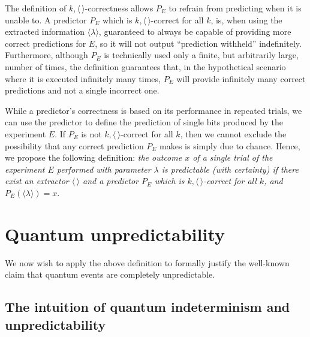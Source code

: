 \documentclass[%
 superscriptaddress,
 preprint,
 showpacs,
 showkeys,
 preprintnumbers,
  amsmath,amssymb,
  aps,
 pra,
  longbibliography,
  floatfix,
 ]{revtex4-1}
\theoremstyle{definition}
\begin{document}

The definition of $k,\langle \, \rangle$-correctness allows $P_E$ to refrain from predicting when it is unable to.
A predictor $P_E$ which is $k,\langle \, \rangle$-correct for all $k$,  is, when using the extracted information $\langle\lambda\rangle$, guaranteed to always be capable of providing more correct predictions for $E$,
so it will not output ``prediction withheld'' indefinitely.
Furthermore, although $P_E$ is technically used only a finite, but arbitrarily large, number of times, the definition guarantees that, in the hypothetical scenario where it is executed infinitely many times, $P_E$ will provide  infinitely many correct predictions and not a single incorrect one.


While a predictor's correctness is based on its performance in repeated trials,  we can use the predictor to define the prediction of single bits produced by the experiment $E$.
If $P_E$ is not $k,\langle \, \rangle$-correct for all $k$, then we cannot exclude the possibility that any correct prediction $P_E$ makes is simply due to chance.
Hence, we propose the following definition: \emph{the outcome $x$ of a single trial of the experiment $E$ performed with parameter $\lambda$ is {\rm predictable} (with certainty) if there exist an extractor $\langle \, \rangle$ and a predictor $P_E$ which is $k,\langle \, \rangle$-correct for all $k$, and $P_E(\langle\lambda\rangle)=x$}.

\section{Quantum unpredictability}%

We now wish to  apply the above definition to formally justify  the well-known claim that quantum events are completely unpredictable.

\subsection{The intuition of quantum indeterminism and unpredictability}
\end{document}
